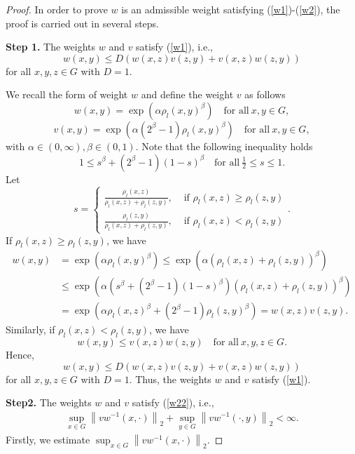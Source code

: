 \documentclass[preprint,11pt]{elsarticle}
\numberwithin{equation}{section}
\begin{document}
	\begin{proof}
		
		In order to prove $w$ is an admissible weight satisfying (\ref{w1})-(\ref{w2}), the proof is carried out in several steps.
		
		\textbf{Step 1.}  The weights $w$ and $v$ satisfy (\ref{w1}), i.e.,
		$$w(x,y)\le D\left ( w(x,z)v(z,y)+ v(x,z)w(z,y)\right)$$ for all $x,y,z\in G$ with $D=1$.
		
		\noindent We recall the form of weight $w$ and define the weight $v$ as follows
		\begin{equation}
			\label{adw1}
			w(x,y)=\exp(\alpha \rho_{l }(x,y)^{\beta})\quad \text{for~all}~ x,y\in G,
		\end{equation}
		\begin{equation}\label{adv1}
			v(x,y)=\exp(\alpha (2^{\beta }-1) \rho_{l}(x,y)^{\beta}) \quad \text{for~all}~ x,y\in G,
		\end{equation}
		with $\alpha\in (0,\infty),\beta \in (0,1)$.
		Note that the following inequality holds
		$$ 1\leq s^\beta +(2^\beta -1)(1-s)^\beta\quad\text{for~all}~\tfrac{1}{2}\leq s \leq 1.$$
		Let 
		$$
		s=\begin{cases}
			\frac{\rho_l(x,z)}{\rho_l(x,z)+\rho_l(z,y)}, &\text{ if } \rho_l(x,z)\geq \rho_l(z,y)\\
			\frac{\rho_l(z,y)}{\rho_l(x,z)+\rho_l(z,y)}, &\text{ if } \rho_l(x,z)< \rho_l(z,y)
		\end{cases}.
		$$
		If $ \rho_l(x,z)\geq \rho_l(z,y)$, we have
		\begin{align*}
			w(x,y)&=\exp(\alpha \rho_{l }(x,y)^{\beta})\le \exp(\alpha( \rho_{l }(x,z)+\rho_{l }(z,y))^{\beta }) \\
			&\leq\exp(\alpha (s^\beta+(2^\beta-1)(1-s)^\beta)( \rho_{l}(x,z)+\rho_{l}(z,y))^{\beta})\\
			&=\exp(\alpha\rho_l(x,z)^\beta +(2^\beta-1)\rho_l(z,y)^\beta)=w(x,z)v(z,y).
		\end{align*}
		Similarly, if $\rho_l(x,z)< \rho_l(z,y)$, we have
		$$w(x,y)\leq v(x,z)w(z,y)\quad\text{for~all}~x,y,z\in G.$$
		Hence,
		$$w(x,y)\leq D\left(w(x,z)v(z,y)+v(x,z)w(z,y)\right)$$
		for all $x,y,z\in G$ with $D=1$.
		Thus, the weights $w$ and $v$ satisfy (\ref{w1}).
		
		\textbf{Step2.} The weights $w$ and $v$ satisfy (\ref{w22}), i.e.,
		\begin{align*}
			\sup_{x\in G}\left \| vw^{-1}(x,\cdot ) \right \| _{2}+\sup_{y\in G}\left \| vw^{-1}(\cdot,y ) \right \| _{2}<\infty.
		\end{align*}
		Firstly, we estimate $\sup_{x\in G}\left \| vw^{-1}(x,\cdot ) \right \| _{2}$.
		

\end{proof}
\end{document}
